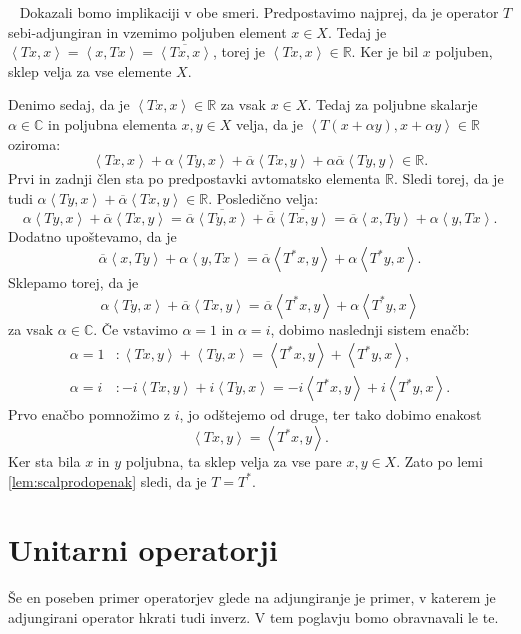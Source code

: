 \documentclass[12pt,a4paper,oneside,fleqn,openany]{book}
\newcommand{\eopf}{\raisebox{0.8ex}{\framebox{}}} %
\newenvironment{dokaz}%
{\noindent{\bf Dokaz.}\ }%
{\hfill\eopf\par\bigskip}%
\newcommand{\R}{\mathbb{R}}
\newcommand{\C}{\mathbb{C}}
\newcommand{\Sp}[2]{\ensuremath{\left<#1, #2\right>}}
\begin{document}
\begin{dokaz}
	Dokazali bomo implikaciji v obe smeri.
		Predpostavimo najprej, da je operator $T$ sebi-adjungiran in vzemimo poljuben element $x\in X$. Tedaj je $\Sp{Tx}{x} = \Sp{x}{Tx} = \overline{\Sp{Tx}{x}}$, torej je $\Sp{Tx}{x}\in \R$. Ker je bil $x$ poljuben, sklep velja za vse elemente $X$.
		
		Denimo sedaj, da je $\Sp{Tx}{x}\in\R$ za vsak $x\in X$. Tedaj za poljubne skalarje $\alpha\in\C$ in poljubna elementa $x, y\in X$ velja, da je $\Sp{T(x + \alpha y)}{x + \alpha y}\in \R$ oziroma: $$\Sp{Tx}{x} + \alpha\Sp{Ty}{x} + \overline{\alpha}\Sp{Tx}{y} + \alpha\overline{\alpha}\Sp{Ty}{y}\in\R.$$
		Prvi in zadnji člen sta po predpostavki avtomatsko elementa $\R$. Sledi torej, da je tudi $\alpha\Sp{Ty}{x} + \overline{\alpha}\Sp{Tx}{y}\in\R$. Posledično velja: $$\alpha\Sp{Ty}{x} + \overline{\alpha}\Sp{Tx}{y} = \overline{\alpha}\overline{\Sp{Ty}{x}} + \overline{\overline{\alpha}}\overline{\Sp{Tx}{y}} = \overline{\alpha}\Sp{x}{Ty} + \alpha\Sp{y}{Tx}.$$
		Dodatno upoštevamo, da je $$\overline{\alpha}\Sp{x}{Ty} + \alpha\Sp{y}{Tx} = \overline{\alpha}\Sp{T^*x}{y} + \alpha\Sp{T^*y}{x}.$$ Sklepamo torej, da je $$\alpha\Sp{Ty}{x} + \overline{\alpha}\Sp{Tx}{y}=\overline{\alpha}\Sp{T^*x}{y} + \alpha\Sp{T^*y}{x}$$ za vsak $\alpha\in\C$. Če vstavimo $\alpha = 1$ in $\alpha = i$, dobimo naslednji sistem enačb: \begin{align*}
			\alpha = 1&:\Sp{Tx}{y} + \Sp{Ty}{x} = \Sp{T^*x}{y} + \Sp{T^*y}{x}, \\
			\alpha = i&:-i\Sp{Tx}{y} + i\Sp{Ty}{x} = -i\Sp{T^*x}{y} + i\Sp{T^*y}{x}.
		\end{align*}
		Prvo enačbo pomnožimo z $i$, jo odštejemo od druge, ter tako dobimo enakost $$\Sp{Tx}{y} = \Sp{T^*x}{y}.$$ Ker sta bila $x$ in $y$ poljubna, ta sklep velja za vse pare $x, y \in X$. Zato po lemi \ref{lem:scalprodopenak} sledi, da je $T = T^*$.
\end{dokaz}

\section[Unitarni operatorji]{Unitarni operatorji}
			
Še en poseben primer operatorjev glede na adjungiranje je primer, v katerem je adjungirani operator hkrati tudi inverz. V tem poglavju bomo obravnavali le te.
\end{document}
